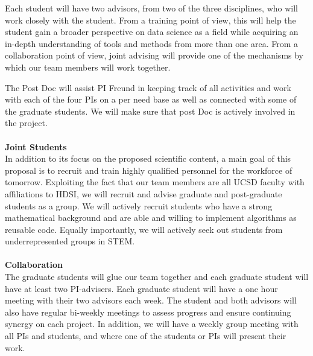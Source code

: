 \documentclass{article}
\begin{document}
Each student will have two advisors, from two of the three
disciplines, who will work closely with the student. From a training
point of view, this will help the student gain a broader perspective
on data science as a field while acquiring an in-depth understanding
of tools and methods from more than one area. From a collaboration
point of view, joint advising will provide one of the mechanisms by
which our team members will work together.

The Post Doc will assist PI Freund in keeping track of all activities and work with each of the four PIs on a per need base as well as connected with some of the graduate students. We will make sure that post Doc is actively involved in the project.
%
%
\\
\\
{\bf Joint Students}\\
In addition to its focus on the proposed scientific content, a main goal of this proposal is to recruit and train highly qualified personnel for the workforce of tomorrow. Exploiting the fact that our team members are all UCSD faculty with affiliations to HDSI, we will recruit and advise graduate and post-graduate students as a
group. We will actively recruit students who have a strong
mathematical background and are able and willing to implement
algorithms as reusable code. Equally importantly, we will actively seek out students from underrepresented groups in STEM. 
\\
\\
{\bf Collaboration}\\ %
The graduate students will glue our team together and each graduate student will have at least two PI-advisers.  
Each graduate student will have a one hour meeting with their
two advisors each week. The student and both advisors will also have regular bi-weekly meetings to assess progress and ensure continuing synergy on each project.  In addition, we will have a weekly group meeting with all PIs and students, and where one of the students or PIs will present their work. 
\end{document}
